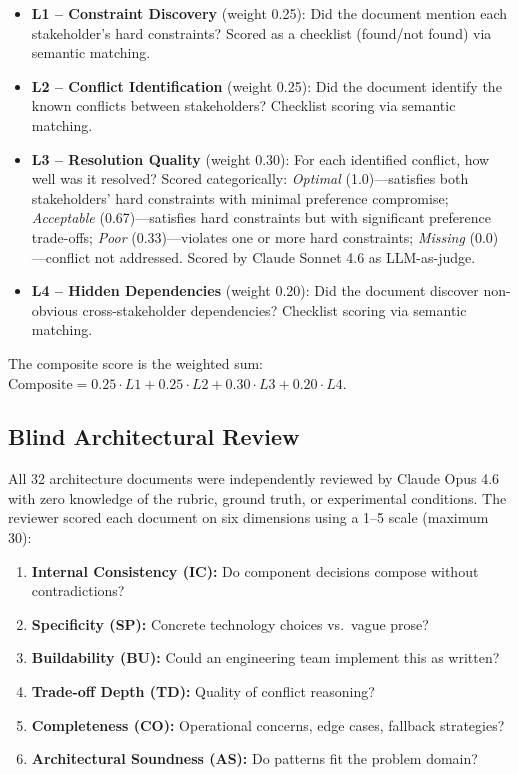 \documentclass[11pt,letterpaper]{article}
\begin{document}
\begin{itemize}
  \item \textbf{L1 -- Constraint Discovery} (weight 0.25): Did the
    document mention each stakeholder's hard constraints? Scored as a
    checklist (found/not found) via semantic matching.
  \item \textbf{L2 -- Conflict Identification} (weight 0.25): Did the
    document identify the known conflicts between stakeholders? Checklist
    scoring via semantic matching.
  \item \textbf{L3 -- Resolution Quality} (weight 0.30): For each
    identified conflict, how well was it resolved? Scored categorically:
    \emph{Optimal} (1.0)---satisfies both stakeholders' hard constraints
    with minimal preference compromise; \emph{Acceptable} (0.67)---satisfies
    hard constraints but with significant preference trade-offs;
    \emph{Poor} (0.33)---violates one or more hard constraints;
    \emph{Missing} (0.0)---conflict not addressed. Scored by Claude
    Sonnet 4.6 as LLM-as-judge.
  \item \textbf{L4 -- Hidden Dependencies} (weight 0.20): Did the
    document discover non-obvious cross-stakeholder dependencies? Checklist
    scoring via semantic matching.
\end{itemize}

The composite score is the weighted sum:
$\text{Composite} = 0.25 \cdot L1 + 0.25 \cdot L2 + 0.30 \cdot L3 + 0.20 \cdot L4$.

\subsection{Blind Architectural Review}

All 32 architecture documents were independently reviewed by Claude
Opus 4.6 with zero knowledge of the rubric, ground truth, or
experimental conditions. The reviewer scored each document on six
dimensions using a 1--5 scale (maximum 30):

\begin{enumerate}
  \item \textbf{Internal Consistency (IC):} Do component decisions
    compose without contradictions?
  \item \textbf{Specificity (SP):} Concrete technology choices vs.\
    vague prose?
  \item \textbf{Buildability (BU):} Could an engineering team implement
    this as written?
  \item \textbf{Trade-off Depth (TD):} Quality of conflict reasoning?
  \item \textbf{Completeness (CO):} Operational concerns, edge cases,
    fallback strategies?
  \item \textbf{Architectural Soundness (AS):} Do patterns fit the
    problem domain?
\end{enumerate}
\end{document}
